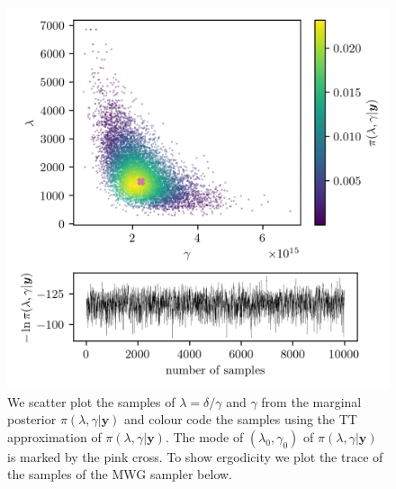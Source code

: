 \begin{figure}[h!]
	\centering
	\includegraphics{ScatterplusHistoPlusTT.png}
	\caption[Scatter plot of samples from marginal posterior, including weighting from TT approximation; trace plot of the marginal posterior samples.]{We scatter plot the samples of $\lambda = \delta / \gamma $ and $\gamma$ from the marginal posterior $\pi(\lambda , \gamma  | \bm{y})$ and colour code the samples using the TT approximation of $\pi(\lambda , \gamma  | \bm{y})$. The mode of $(\lambda_0 , \gamma_0)$ of $\pi(\lambda , \gamma  | \bm{y})$ is marked by the pink cross. To show ergodicity we plot the trace of the samples of the MWG sampler below.}
	\label{fig:ScatterPlotTT}
\end{figure}
\clearpage



